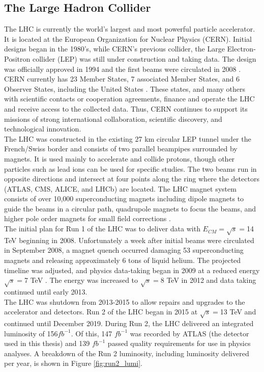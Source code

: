 \subsection{The Large Hadron Collider}
The LHC is currently the world’s largest and most powerful particle accelerator. It is located at the European Organization for Nuclear Physics (CERN). Initial designs began in the 1980's, while CERN's previous collider, the Large Electron-Positron collider (LEP) was still under construction and taking data. The design was officially approved in 1994 and the first beams were circulated in 2008 \cite{lhc_guide}. CERN currently has 23 Member States, 7 associated Member States, and 6 Observer States, including the United States \cite{members}. These states, and many others with scientific contacts or cooperation agreements, finance and operate the LHC and receive access to the collected data. Thus, CERN continues to support its missions of strong international collaboration, scientific discovery, and technological innovation.\\

The LHC was constructed in the existing 27 km circular LEP tunnel under the French/Swiss border and consists of two parallel beampipes surrounded by magnets. It is used mainly to accelerate and collide protons, though other particles such as lead ions can be used for specific studies. The two beams run in opposite directions and intersect at four points along the ring where the detectors (ATLAS, CMS, ALICE, and LHCb) are located. The LHC magnet system consists of over 10,000 superconducting magnets including dipole magnets to guide the beams in a circular path, quadrupole magnets to focus the beams, and higher pole order magnets for small field corrections \cite{lhc_tdr}.\\

The initial plan for Run 1 of the LHC was to deliver data with $E_{CM}=\sqrt{s}=$14 TeV beginning in 2008. Unfortunately a week after initial beams were circulated in September 2008, a magnet quench occurred damaging 53 superconducting magnets and releasing approximately 6 tons of liquid helium. The projected timeline was adjusted, and physics data-taking began in 2009 at a reduced energy $\sqrt{s}=$7 TeV \cite{adj_commis}. The energy was increased to $\sqrt{s}=$8 TeV in 2012 and data taking continued until early 2013.\\

The LHC was shutdown from 2013-2015 to allow repairs and upgrades to the accelerator and detectors. Run 2 of the LHC began in 2015 at $\sqrt{s}=$13 TeV and continued until December 2019. During Run 2, the LHC delivered an integrated luminosity of 156$fb^{-1}$. Of this, 147 $fb^{-1}$ was recorded by ATLAS (the detector used in this thesis) and 139 $fb^{-1}$ passed quality requirements for use in physics analyses. A breakdown of the Run 2 luminosity, including luminosity delivered per year, is shown in Figure \ref{fig:run2_lumi}.\\

